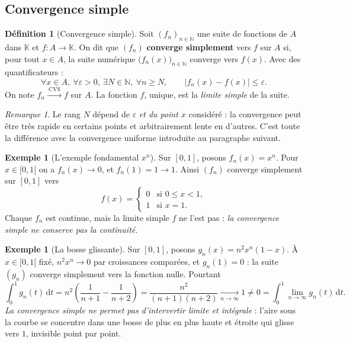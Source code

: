 \documentclass[11pt,a4paper]{article}
\theoremstyle{plain}
\theoremstyle{definition}
\newtheorem{definition}[theoreme]{Définition}
\newtheorem{exemple}[theoreme]{Exemple}
\theoremstyle{remark}
\newtheorem{remarque}[theoreme]{Remarque}
\newcommand{\N}{\mathbb{N}}
\newcommand{\K}{\mathbb{K}}
\newcommand{\eps}{\varepsilon}
\newcommand{\dd}{\,\mathrm{d}}
\numberwithin{equation}{section}
\begin{document}
\subsection{Convergence simple}

\begin{definition}[Convergence simple]
Soit $(f_n)_{n\in\N}$ une suite de fonctions de $A$ dans $\K$ et
$f : A \to \K$. On dit que $(f_n)$ \textbf{converge simplement} vers $f$
sur $A$ si, pour tout $x\in A$, la suite numérique $\bigl(f_n(x)\bigr)_{n\in\N}$
converge vers $f(x)$. Avec des quantificateurs :
\[
    \forall x\in A,\ \forall \eps>0,\ \exists N\in\N,\ \forall n\geq N,
    \qquad \lvert f_n(x)-f(x)\rvert \leq \eps .
\]
On note $f_n \xrightarrow{\ \mathrm{CVS}\ } f$ sur $A$. La fonction $f$,
unique, est la \emph{limite simple} de la suite.
\end{definition}

\begin{remarque}
Le rang $N$ dépend de $\eps$ \emph{et du point $x$} considéré : la
convergence peut être très rapide en certains points et arbitrairement
lente en d'autres. C'est toute la différence avec la convergence uniforme
introduite au paragraphe suivant.
\end{remarque}

\begin{exemple}[L'exemple fondamental $x^n$]\label{ex:xn}
Sur $[0,1]$, posons $f_n(x)=x^n$. Pour $x\in[0,1[$ on a $f_n(x)\to 0$, et
$f_n(1)=1\to 1$. Ainsi $(f_n)$ converge simplement sur $[0,1]$ vers
\[
    f(x)=\begin{cases} 0 & \text{si } 0\leq x<1,\\ 1 & \text{si } x=1.\end{cases}
\]
Chaque $f_n$ est continue, mais la limite simple $f$ ne l'est pas : \emph{la
convergence simple ne conserve pas la continuité.}
\end{exemple}

\begin{exemple}[La bosse glissante]\label{ex:bosse}
Sur $[0,1]$, posons $g_n(x)=n^2 x^n(1-x)$. À $x\in[0,1[$ fixé,
$n^2x^n\to 0$ par croissances comparées, et $g_n(1)=0$ : la suite $(g_n)$
converge simplement vers la fonction nulle. Pourtant
\[
    \int_0^1 g_n(t)\dd t
    = n^2\left(\frac{1}{n+1}-\frac{1}{n+2}\right)
    = \frac{n^2}{(n+1)(n+2)} \xrightarrow[n\to\infty]{} 1 \neq 0
    = \int_0^1 \lim_{n\to\infty} g_n(t)\dd t .
\]
\emph{La convergence simple ne permet pas d'intervertir limite et
intégrale} : l'aire sous la courbe se concentre dans une \og bosse \fg{} de
plus en plus haute et étroite qui glisse vers $1$, invisible point par point.
\end{exemple}
\end{document}
